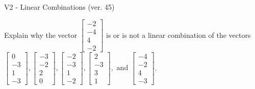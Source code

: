 \begin{exercise}
  \begin{exerciseTitle}V2 - Linear Combinations (ver. 45)\end{exerciseTitle}
  \begin{exerciseStatement}
    Explain why the vector \(\left[\begin{array}{c}
-2 \\
-4 \\
4 \\
-2
\end{array}\right]\)  is or is not a linear 
	combination of the vectors \(\left[\begin{array}{c}
0 \\
-3 \\
1 \\
-3
\end{array}\right] , \left[\begin{array}{c}
-3 \\
-2 \\
2 \\
0
\end{array}\right] , \left[\begin{array}{c}
-2 \\
-3 \\
1 \\
-2
\end{array}\right] , \left[\begin{array}{c}
2 \\
-3 \\
3 \\
1
\end{array}\right] , \text{ and } \left[\begin{array}{c}
-4 \\
-2 \\
4 \\
-3
\end{array}\right]\).
	



\end{exerciseStatement}
\end{exercise}
